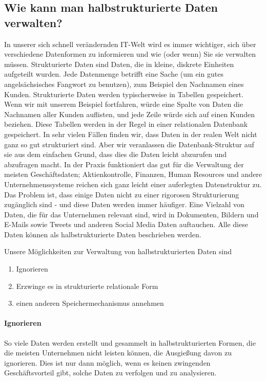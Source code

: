 \subsection{Wie kann man halbstrukturierte Daten verwalten?}
In unserer sich schnell verändernden IT-Welt wird es immer wichtiger, sich über verschiedene Datenformen zu informieren und wie (oder wenn) Sie sie verwalten müssen.
Strukturierte Daten sind Daten, die in kleine, diskrete Einheiten aufgeteilt wurden. Jede Datenmenge betrifft eine Sache (um ein gutes angelsächsisches Fangwort zu benutzen), zum Beispiel den Nachnamen eines Kunden. Strukturierte Daten werden typischerweise in Tabellen gespeichert. Wenn wir mit unserem Beispiel fortfahren, würde eine Spalte von Daten die Nachnamen aller Kunden auflisten, und jede Zeile würde sich auf einen Kunden beziehen. Diese Tabellen werden in der Regel in einer relationalen Datenbank gespeichert. \cite{lore}
In sehr vielen Fällen finden wir, dass Daten in der realen Welt nicht ganz so gut strukturiert sind. Aber wir veranlassen die Datenbank-Struktur auf sie aus dem einfachen Grund, dass dies die Daten leicht abzurufen und abzufragen macht. In der Praxis funktioniert das gut für die Verwaltung der meisten Geschäftsdaten; Aktienkontrolle, Finanzen, Human Resources und andere Unternehmenssysteme reichen sich ganz leicht einer auferlegten Datenstruktur zu.
Das Problem ist, dass einige Daten nicht zu einer rigorosen Strukturierung zugänglich sind - und diese Daten werden immer häufiger. Eine Vielzahl von Daten, die für das Unternehmen relevant sind, wird in Dokumenten, Bildern und E-Mails sowie Tweets und anderen Social Media Daten auftauchen. Alle diese Daten können als halbstrukturierte Daten beschrieben werden. \cite{abiteboul2000}

Unsere Möglichkeiten zur Verwaltung von halbstrukturierten Daten sind
\begin{enumerate}
	\item Ignorieren
	\item Erzwinge es in strukturierte relationale Form
	\item einen anderen Speichermechanismus annehmen
\end{enumerate}

\paragraph{Ignorieren} So viele Daten werden erstellt und gesammelt in halbstrukturierten Formen, die die meisten Unternehmen nicht leisten können, die Ausgießung davon zu ignorieren. Dies ist nur dann möglich, wenn es keinen zwingenden Geschäftsvorteil gibt, solche Daten zu verfolgen und zu analysieren.
